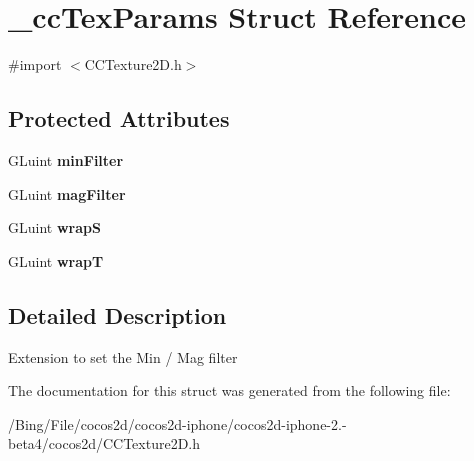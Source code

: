 \hypertarget{struct__cc_tex_params}{\section{\-\_\-cc\-Tex\-Params Struct Reference}
\label{struct__cc_tex_params}
}


{\ttfamily \#import $<$C\-C\-Texture2\-D.\-h$>$}

\subsection*{Protected Attributes}
\begin{DoxyCompactItemize}
\item 
\hypertarget{struct__cc_tex_params_a66ef303f14ef78c11d386d1ef5acf544}{G\-Luint {\bfseries min\-Filter}}\label{struct__cc_tex_params_a66ef303f14ef78c11d386d1ef5acf544}

\item 
\hypertarget{struct__cc_tex_params_a01d120824cbc059bfce37b7b1d38f613}{G\-Luint {\bfseries mag\-Filter}}\label{struct__cc_tex_params_a01d120824cbc059bfce37b7b1d38f613}

\item 
\hypertarget{struct__cc_tex_params_a937798619260278e5e27ab0f1a79e197}{G\-Luint {\bfseries wrap\-S}}\label{struct__cc_tex_params_a937798619260278e5e27ab0f1a79e197}

\item 
\hypertarget{struct__cc_tex_params_aef8621b667e793f737f09a3bf5c92480}{G\-Luint {\bfseries wrap\-T}}\label{struct__cc_tex_params_aef8621b667e793f737f09a3bf5c92480}

\end{DoxyCompactItemize}


\subsection{Detailed Description}
Extension to set the Min / Mag filter 

The documentation for this struct was generated from the following file\-:\begin{DoxyCompactItemize}
\item 
/\-Bing/\-File/cocos2d/cocos2d-\/iphone/cocos2d-\/iphone-\/2.-\/beta4/cocos2d/C\-C\-Texture2\-D.\-h\end{DoxyCompactItemize}
